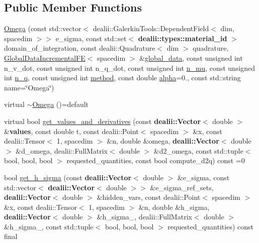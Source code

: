 \subsection*{Public Member Functions}
\begin{DoxyCompactItemize}
\item 
\hyperlink{classincremental_f_e_1_1_omega_a53ca9e46c52887166cbb4f393d37f432}{Omega} (const std\+::vector$<$ dealii\+::\+Galerkin\+Tools\+::\+Dependent\+Field$<$ dim, spacedim $>$$>$ e\+\_\+sigma, const std\+::set$<$ {\bf dealii\+::types\+::material\+\_\+id} $>$ domain\+\_\+of\+\_\+integration, const dealii\+::\+Quadrature$<$ dim $>$ quadrature, \hyperlink{classincremental_f_e_1_1_global_data_incremental_f_e}{Global\+Data\+Incremental\+FE}$<$ spacedim $>$ \&\hyperlink{classincremental_f_e_1_1_omega_abd23d288a7a4a43f9b528be968cd2113}{global\+\_\+data}, const unsigned int n\+\_\+v\+\_\+dot, const unsigned int n\+\_\+q\+\_\+dot, const unsigned int \hyperlink{classincremental_f_e_1_1_omega_a322340b50451ab46f91cdcec95248f16}{n\+\_\+mu}, const unsigned int \hyperlink{classincremental_f_e_1_1_omega_addbf75c949792f6340ea40164a2bfee3}{n\+\_\+q}, const unsigned int \hyperlink{classincremental_f_e_1_1_omega_a7600d263ebf98129629e44fa67e8a58c}{method}, const double \hyperlink{classincremental_f_e_1_1_omega_a891688560ec0ad8dc5a0058a7b400269}{alpha}=0., const std\+::string name=\char`\"{}Omega\char`\"{})
\item 
virtual \hyperlink{classincremental_f_e_1_1_omega_a262968e5daadc162b22fdc58dd760976}{$\sim$\+Omega} ()=default
\item 
virtual bool \hyperlink{classincremental_f_e_1_1_omega_a2f35d862aefa11151de5b7c7411e45df}{get\+\_\+values\+\_\+and\+\_\+derivatives} (const {\bf dealii\+::\+Vector}$<$ double $>$ \&{\bf values}, const double t, const dealii\+::\+Point$<$ spacedim $>$ \&x, const dealii\+::\+Tensor$<$ 1, spacedim $>$ \&n, double \&omega, {\bf dealii\+::\+Vector}$<$ double $>$ \&d\+\_\+omega, dealii\+::\+Full\+Matrix$<$ double $>$ \&d2\+\_\+omega, const std\+::tuple$<$ bool, bool, bool $>$ requested\+\_\+quantities, const bool compute\+\_\+d2q) const =0
\item 
bool \hyperlink{classincremental_f_e_1_1_omega_a2e316d9a4f9ef784bc73ef13d2ebb214}{get\+\_\+h\+\_\+sigma} (const {\bf dealii\+::\+Vector}$<$ double $>$ \&e\+\_\+sigma, const std\+::vector$<$ {\bf dealii\+::\+Vector}$<$ double $>$$>$ \&e\+\_\+sigma\+\_\+ref\+\_\+sets, {\bf dealii\+::\+Vector}$<$ double $>$ \&hidden\+\_\+vars, const dealii\+::\+Point$<$ spacedim $>$ \&x, const dealii\+::\+Tensor$<$ 1, spacedim $>$ \&n, double \&h\+\_\+sigma, {\bf dealii\+::\+Vector}$<$ double $>$ \&h\+\_\+sigma\+\_, dealii\+::\+Full\+Matrix$<$ double $>$ \&h\+\_\+sigma\+\_, const std\+::tuple$<$ bool, bool, bool $>$ requested\+\_\+quantities) const final
\end{DoxyCompactItemize}
